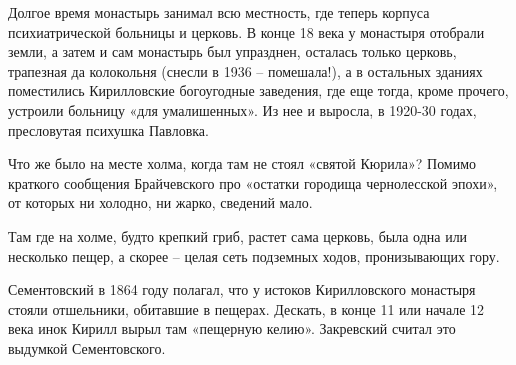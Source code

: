 




Долгое время монастырь занимал всю местность, где теперь корпуса психиатрической больницы и церковь. В конце 18 века у монастыря отобрали земли, а затем и сам монастырь был упразднен, осталась только церковь, трапезная да колокольня (снесли в 1936 – помешала!), а в остальных зданиях поместились Кирилловские богоугодные заведения, где еще тогда, кроме прочего, устроили больницу «для умалишенных». Из нее и выросла, в 1920-30 годах, пресловутая психушка Павловка. 

Что же было на месте холма, когда там не стоял «святой Кюрила»? Помимо краткого сообщения Брайчевского про «остатки городища чернолесской эпохи», от которых ни холодно, ни жарко, сведений мало.

Там где на холме, будто крепкий гриб, растет сама церковь, была одна или несколько пещер, а скорее – целая сеть подземных ходов, пронизывающих гору.

Сементовский в 1864 году полагал, что у истоков Кирилловского монастыря стояли отшельники, обитавшие в пещерах. Дескать, в конце 11 или начале 12 века инок Кирилл вырыл там «пещерную келию». Закревский считал это выдумкой Сементовского.

